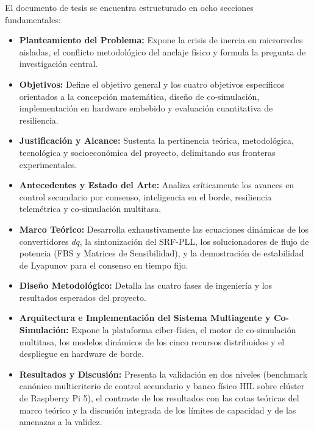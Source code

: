El documento de tesis se encuentra estructurado en ocho secciones fundamentales:
\begin{itemize}
    \item \textbf{Planteamiento del Problema:} Expone la crisis de inercia en microrredes aisladas, el conflicto metodológico del anclaje físico y formula la pregunta de investigación central.
    \item \textbf{Objetivos:} Define el objetivo general y los cuatro objetivos específicos orientados a la concepción matemática, diseño de co-simulación, implementación en hardware embebido y evaluación cuantitativa de resiliencia.
    \item \textbf{Justificación y Alcance:} Sustenta la pertinencia teórica, metodológica, tecnológica y socioeconómica del proyecto, delimitando sus fronteras experimentales.
    \item \textbf{Antecedentes y Estado del Arte:} Analiza críticamente los avances en control secundario por consenso, inteligencia en el borde, resiliencia telemétrica y co-simulación multitasa.
    \item \textbf{Marco Teórico:} Desarrolla exhaustivamente las ecuaciones dinámicas de los convertidores $dq$, la sintonización del SRF-PLL, los solucionadores de flujo de potencia (FBS y Matrices de Sensibilidad), y la demostración de estabilidad de Lyapunov para el consenso en tiempo fijo.
    \item \textbf{Diseño Metodológico:} Detalla las cuatro fases de ingeniería y los resultados esperados del proyecto.
    \item \textbf{Arquitectura e Implementación del Sistema Multiagente y Co-Simulación:} Expone la plataforma ciber-física, el motor de co-simulación multitasa, los modelos dinámicos de los cinco recursos distribuidos y el despliegue en hardware de borde.
    \item \textbf{Resultados y Discusión:} Presenta la validación en dos niveles (benchmark canónico multicriterio de control secundario y banco físico HIL sobre clúster de Raspberry Pi 5), el contraste de los resultados con las cotas teóricas del marco teórico y la discusión integrada de los límites de capacidad y de las amenazas a la validez.
\end{itemize}